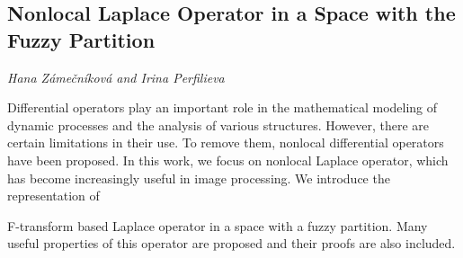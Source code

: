 \documentclass[../booklet.tex]{subfiles}
\begin{document}
\subsection[Nonlocal Laplace Operator in a Space with the Fuzzy Partition. {\it Hana Zámečníková and Irina Perfilieva}]{Nonlocal Laplace Operator in a Space with the Fuzzy Partition}
 

\begin{center}
  {\it Hana Zámečníková and Irina Perfilieva}
\end{center}

\vskip 0.8cm


Differential operators play an important role in the mathematical modeling of dynamic processes and the analysis of various structures. However, there are certain limitations in their use. To remove them, nonlocal differential operators have been proposed. In this work, we focus on nonlocal Laplace operator, which has become increasingly useful in image processing. We introduce the representation of 

F-transform based Laplace operator in a space with a fuzzy partition. Many useful properties of this operator are proposed and their proofs are also included.


\end{document}
